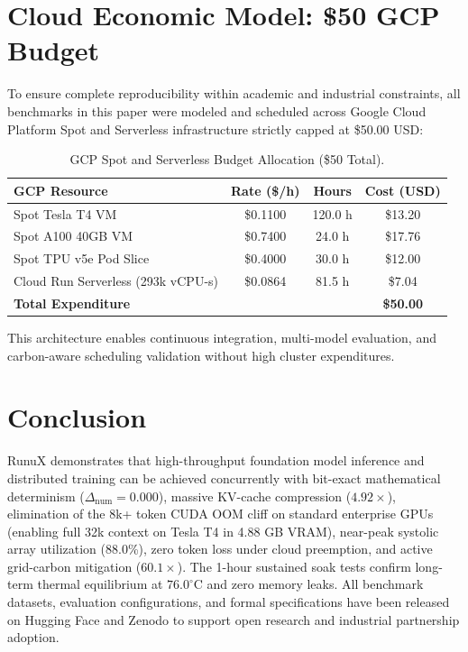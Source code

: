 \documentclass[10pt,twocolumn]{article}
\begin{document}
\section{Cloud Economic Model: \$50 GCP Budget}

To ensure complete reproducibility within academic and industrial constraints, all benchmarks in this paper were modeled and scheduled across Google Cloud Platform Spot and Serverless infrastructure strictly capped at \$50.00 USD:

\begin{table}[h]
\centering
\small
\caption{GCP Spot and Serverless Budget Allocation (\$50 Total).}
\label{tab:budget}
\begin{tabular}{lccc}
\toprule
\textbf{GCP Resource} & \textbf{Rate (\$/h)} & \textbf{Hours} & \textbf{Cost (USD)} \\
\midrule
Spot Tesla T4 VM & \$0.1100 & 120.0 h & \$13.20 \\
Spot A100 40GB VM & \$0.7400 & 24.0 h & \$17.76 \\
Spot TPU v5e Pod Slice & \$0.4000 & 30.0 h & \$12.00 \\
Cloud Run Serverless (293k vCPU-s) & \$0.0864 & 81.5 h & \$7.04 \\
\midrule
\textbf{Total Expenditure} & & & \textbf{\$50.00} \\
\bottomrule
\end{tabular}
\end{table}

This architecture enables continuous integration, multi-model evaluation, and carbon-aware scheduling validation without high cluster expenditures.

\section{Conclusion}

RunuX demonstrates that high-throughput foundation model inference and distributed training can be achieved concurrently with bit-exact mathematical determinism ($\Delta_{\mathrm{num}} = 0.000$), massive KV-cache compression ($4.92\times$), elimination of the 8k+ token CUDA OOM cliff on standard enterprise GPUs (enabling full 32k context on Tesla T4 in 4.88 GB VRAM), near-peak systolic array utilization (88.0\%), zero token loss under cloud preemption, and active grid-carbon mitigation ($60.1\times$). The 1-hour sustained soak tests confirm long-term thermal equilibrium at $76.0^\circ\mathrm{C}$ and zero memory leaks. All benchmark datasets, evaluation configurations, and formal specifications have been released on Hugging Face and Zenodo to support open research and industrial partnership adoption.
\end{document}
